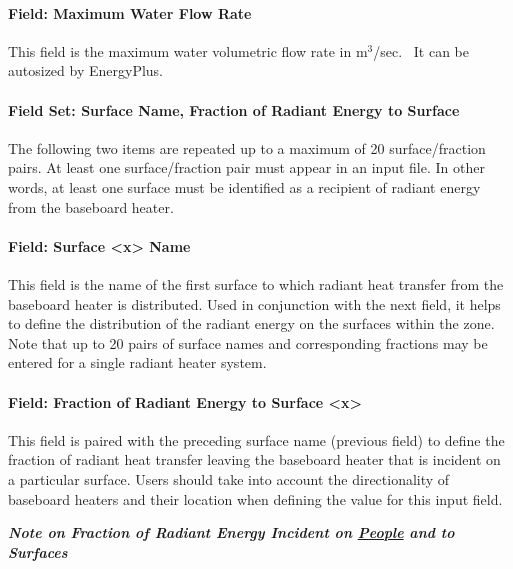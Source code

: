 \paragraph{Field: Maximum Water Flow Rate}\label{field-maximum-water-flow-rate-001}

This field is the maximum water volumetric flow rate in m\(^{3}\)/sec.~ It can be autosized by EnergyPlus.

\paragraph{Field Set: Surface Name, Fraction of Radiant Energy to Surface}\label{field-set-surface-name-fraction-of-radiant-energy-to-surface}

The following two items are repeated up to a maximum of 20 surface/fraction pairs. At least one surface/fraction pair must appear in an input file. In other words, at least one surface must be identified as a recipient of radiant energy from the baseboard heater.

\paragraph{Field: Surface \textless{}x\textgreater{} Name}\label{field-surface-x-name}

This field is the name of the first surface to which radiant heat transfer from the baseboard heater is distributed. Used in conjunction with the next field, it helps to define the distribution of the radiant energy on the surfaces within the zone. Note that up to 20 pairs of surface names and corresponding fractions may be entered for a single radiant heater system.

\paragraph{Field: Fraction of Radiant Energy to Surface \textless{}x\textgreater{}}\label{field-fraction-of-radiant-energy-to-surface-x}

This field is paired with the preceding surface name (previous field) to define the fraction of radiant heat transfer leaving the baseboard heater that is incident on a particular surface. Users should take into account the directionality of baseboard heaters and their location when defining the value for this input field.

\textbf{\emph{Note on Fraction of Radiant Energy Incident on \hyperref[people]{People} and to Surfaces}}

